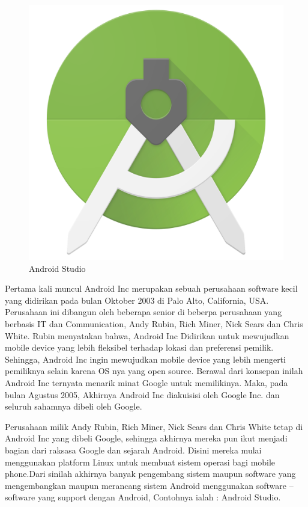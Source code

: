 \begin{figure}[!htbp]
    \centering
    \includegraphics[scale=0.1]{pictures/android-studio.png}
    \caption{Android Studio}
    \label{}
\end{figure}
Pertama kali muncul Android Inc merupakan sebuah perusahaan software kecil yang didirikan pada bulan Oktober 2003 di Palo Alto, California, USA. Perusahaan ini dibangun oleh beberapa senior di beberpa perusahaan yang berbasis IT dan Communication, Andy Rubin, Rich Miner, Nick Sears dan Chris White. Rubin menyatakan bahwa, Android Inc Didirikan untuk mewujudkan mobile device yang lebih fleksibel terhadap lokasi dan preferensi pemilik. Sehingga, Android Inc ingin mewujudkan mobile device yang lebih mengerti pemiliknya selain karena OS nya yang open source. Berawal dari konsepan inilah Android Inc ternyata menarik minat Google untuk memilikinya. Maka, pada bulan Agustus 2005, Akhirnya Android Inc diakuisisi oleh Google Inc. dan seluruh sahamnya dibeli oleh Google.

Perusahaan milik Andy Rubin, Rich Miner, Nick Sears dan Chris White tetap di Android Inc yang dibeli Google, sehingga akhirnya mereka pun ikut  menjadi bagian dari raksasa Google dan sejarah Android. Disini mereka mulai menggunakan platform Linux untuk membuat sistem operasi bagi mobile phone.Dari sinilah akhirnya banyak pengembang sistem maupun software yang mengembangkan maupun merancang sistem Android menggunakan software – software yang support dengan Android, Contohnya ialah : Android Studio.

